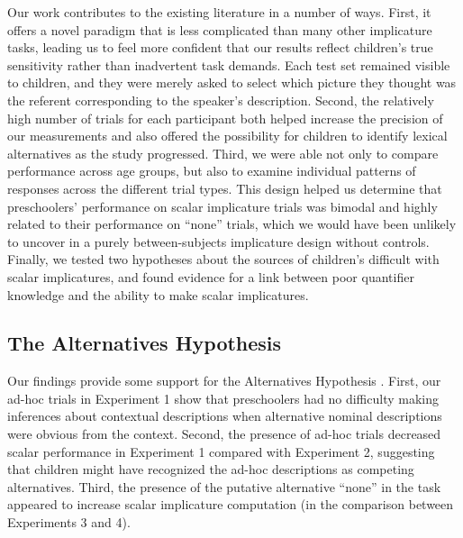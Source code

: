 \documentclass[man]{apa2}
\begin{document}

Our work contributes to the existing literature in a number of ways. First, it offers a novel paradigm that is less complicated than many other implicature tasks, leading us to feel more confident that our results reflect children's true sensitivity rather than inadvertent task demands. Each test set remained visible to children, and they were merely asked to select which picture they thought was the referent corresponding to the speaker's description. Second, the relatively high number of trials for each participant both helped increase the precision of our measurements and also offered the possibility for children to identify lexical alternatives as the study progressed. Third, we were able not only to compare performance across age groups, but also to examine individual patterns of responses across the different trial types. This design helped us determine that preschoolers' performance on scalar implicature trials was bimodal and highly related to their performance on ``none'' trials, which we would have been unlikely to uncover in a purely between-subjects implicature design without controls. Finally, we tested two hypotheses about the sources of children's difficult with scalar implicatures, and found evidence for a link between poor quantifier knowledge and the ability to make scalar implicatures.

\subsection{The Alternatives Hypothesis}

Our findings provide some support for the Alternatives Hypothesis \cite{barner2010,barner2011}. First, our ad-hoc trials in Experiment 1 show that preschoolers had no difficulty making inferences about contextual descriptions when alternative nominal descriptions were obvious from the context. Second, the presence of ad-hoc trials decreased scalar performance in Experiment 1 compared with Experiment 2, suggesting that children might have recognized the ad-hoc descriptions as competing alternatives. Third, the presence of the putative alternative ``none'' in the task appeared to increase scalar implicature computation (in the comparison between Experiments 3 and 4).
\end{document}
